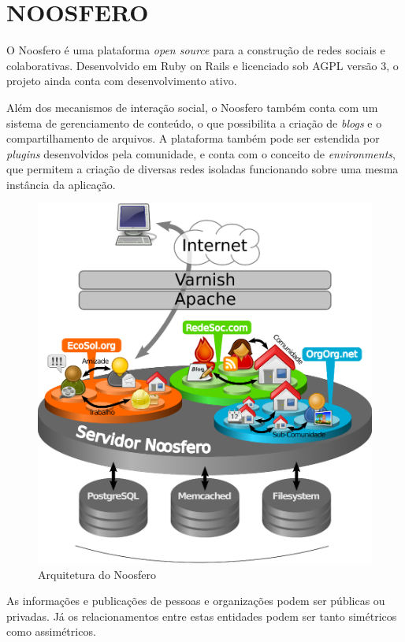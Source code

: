 \chapter{NOOSFERO}

O Noosfero é uma plataforma \textit{open source} para a construção de redes sociais
e colaborativas. Desenvolvido em Ruby on Rails e licenciado sob AGPL versão 3, o
projeto ainda conta com desenvolvimento ativo.

Além dos mecanismos de interação social, o Noosfero também conta com um sistema de
gerenciamento de conteúdo, o que possibilita a criação de \textit{blogs} e o
compartilhamento de arquivos. A plataforma também pode ser estendida por
\textit{plugins} desenvolvidos pela comunidade, e conta com o conceito de
\textit{environments}, que permitem a criação de diversas redes isoladas funcionando
sobre uma mesma instância da aplicação.

\begin{figure}[h]
	\centering
		\includegraphics[keepaspectratio=true,scale=0.4]{figuras/noosfero_estrutura.eps}
	\caption{Arquitetura do Noosfero}
	\label{fig:noosferoEstrutura}
\end{figure}

As informações e publicações de pessoas e organizações podem ser públicas ou
privadas. Já os relacionamentos entre estas entidades podem ser tanto simétricos
como assimétricos.

